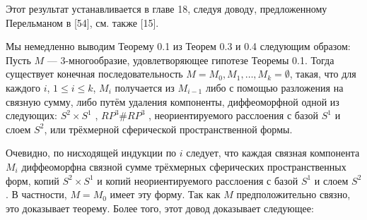 Этот результат устанавливается в главе 18, следуя доводу, предложенному Перельманом 
в [54], см. также [15].

Мы немедленно выводим Теорему 0.1 из Теорем 0.3 и 0.4 следующим образом:
Пусть $M$ — 3-многообразие, удовлетворяющее гипотезе Теоремы 0.1. Тогда 
существует конечная последовательность $M=M_{0},M_{1},…,M_{k}=\emptyset $, такая, что для 
каждого $i$, $1\leq i\leq k$, $M_{i}$ получается из $M_{i-1}$ либо с помощью разложения на связную 
сумму, либо путём удаления компоненты, диффеоморфной одной из следующих: 
$S^{2}\times S^{1}$ , $RP^{3} \# RP^{3}$ , неориентируемого расслоения с базой $S^{1}$ и слоем 
$S^{2}$, или трёхмерной сферической пространственной формы.

Очевидно, по нисходящей индукции по $i$ следует, что каждая связная компонента 
$M_{i}$ диффеоморфна связной сумме трёхмерных сферических пространственных форм, 
копий $S^{2} \times S^{1}$ и копий неориентируемого расслоения с базой $S^{1}$ и слоем 
$S^{2}$. В частности, $M=M_{0}$ имеет эту форму. Так как $M$ предположительно связно, 
это доказывает теорему. Более того, этот довод доказывает следующее: